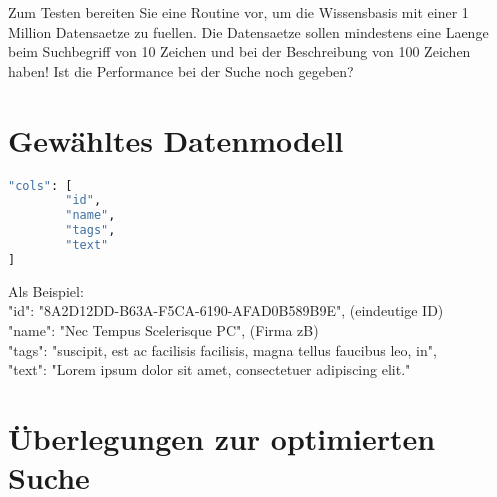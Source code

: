 \documentclass[letterpaper, 12pt]{article}
\let\tempsection\section
\renewcommand\section[1]{\vspace{-0.3cm}\tempsection{#1}\vspace{-0.3cm}}
\begin{document}
Zum Testen bereiten Sie eine Routine vor, um die Wissensbasis mit einer 1 Million Datensaetze zu fuellen. Die Datensaetze sollen mindestens eine Laenge beim Suchbegriff von 10 Zeichen und bei der Beschreibung von 100 Zeichen haben! Ist die Performance bei der Suche noch gegeben?

\newpage
\section{Gewähltes Datenmodell}
\begin{lstlisting}[frame=single, language=bash, caption=Datenmodell]
"cols": [
		"id",
		"name",
		"tags",
		"text"
]
\end{lstlisting} 
Als Beispiel: \\

"id": "8A2D12DD-B63A-F5CA-6190-AFAD0B589B9E", (eindeutige ID) \\
"name": "Nec Tempus Scelerisque PC", (Firma zB) \\
"tags": "suscipit, est ac facilisis facilisis, magna tellus faucibus leo, in", \\
"text": "Lorem ipsum dolor sit amet, consectetuer adipiscing elit." \\

\section{Überlegungen zur optimierten Suche}

\newpage




\lstlistoflistings
\listoffigures
\end{document}
